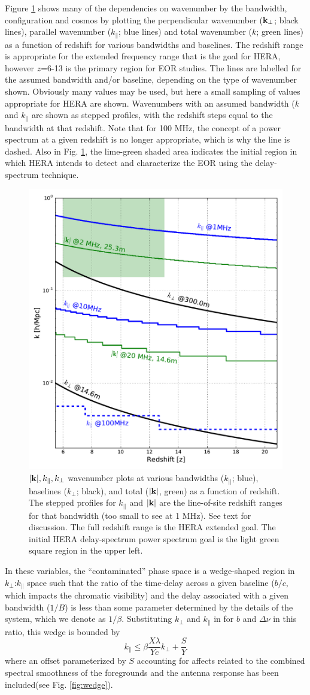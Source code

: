 \documentclass[preprint,11pt]{aastex}
\newcommand{\kvec}{{\bf k}}
\newcommand{\kpr}{{k_\perp}}
\newcommand{\kvpr}{{\kvec_\perp}}
\def\kperp{k_{\bot}}
\def\kpar{k_{\|}}
\begin{document}
Figure \ref{fig:kperf} shows many of the dependencies on wavenumber by the bandwidth, configuration and cosmos by plotting the perpendicular wavenumber ($\kvpr$; black lines), parallel wavenumber ($\kpar$; blue lines) and total wavenumber ($k$; green lines) as a function of redshift for various bandwidths and baselines.  The redshift range is appropriate for the extended frequency range that is the goal for HERA, however $z$=6-13 is the primary region for EOR studies.
The lines are labelled for the assumed bandwidth and/or baseline, depending on the type of wavenumber shown.  Obviously many values may be used, but here a small sampling of values appropriate for HERA are shown.    
Wavenumbers with an assumed bandwidth ($k$ and $\kpar$ are shown as stepped profiles, with the redshift steps equal to the bandwidth at that redshift.
Note that for 100 MHz, the concept of a power spectrum at a given redshift is no longer appropriate, which is why the line is dashed.
Also in Fig. \ref{fig:kperf}, the lime-green shaded area indicates the initial region in which HERA intends to detect and characterize the EOR using the delay-spectrum technique.


\begin{figure}[h!]
\centerline{
\includegraphics[width=.4\textwidth]{plots/kperf.pdf} 
}
\caption{\small $|\kvec |, \kpar, \kperp$ wavenumber plots at various bandwidths ($k_{||}$; blue), baselines ($\kperp$; black), and total ($|\kvec |$, green) as a function of redshift.  The stepped profiles for $k_{||}$ and $|\kvec |$ are the line-of-site redshift ranges for that bandwidth (too small to see at 1 MHz).  See text for discussion.  The full redshift range is the HERA extended goal.  The initial HERA delay-spectrum power spectrum goal is the light green square region in the upper left.}
\label{fig:kperf}
\end{figure}


In these variables, the ``contaminated'' phase space is a wedge-shaped region in $\kpr$:$\kpar$ space such that the ratio of the time-delay across a given baseline ($b/c$,  which impacts the chromatic visibility) and the delay associated with a given bandwidth ($1/B$) is less than some parameter determined by the details of the system, which we denote as $1/\beta$.  Substituting $\kpr$ and $\kpar$ in for $b$ and $\Delta\nu$ in this ratio, this wedge is bounded by
\begin{equation}
\kpar \le \beta\frac{X\lambda}{Yc}\kpr + \frac{S}{Y}
\end{equation}
where an offset parameterized by $S$ accounting for affects related to the combined spectral smoothness of the foregrounds and the antenna response has been included(see Fig. \ref{fig:wedge}). 
\end{document}
